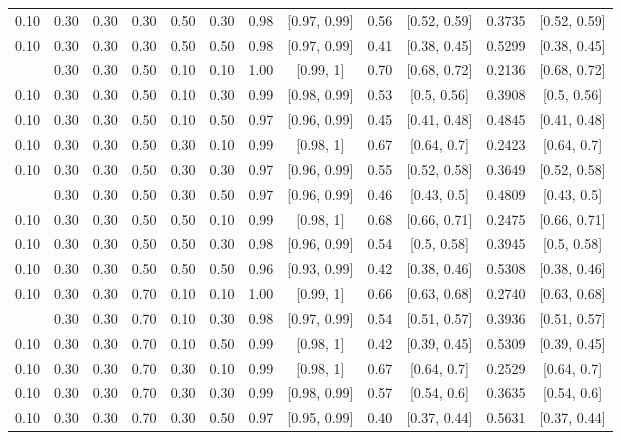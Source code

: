 \documentclass[
  11pt,
]{article}
\begin{document}
\begin{landscape}
\begin{ThreePartTable}
\begin{longtable}[t]{cccccccccccc}
0.10 & 0.30 & 0.30 & 0.30 & 0.50 & 0.30 & 0.98 & {}[0.97, 0.99] & 0.56 & {}[0.52, 0.59] & 0.3735 & {}[0.52, 0.59]\\
0.10 & 0.30 & 0.30 & 0.30 & 0.50 & 0.50 & 0.98 & {}[0.97, 0.99] & 0.41 & {}[0.38, 0.45] & 0.5299 & {}[0.38, 0.45]\\
\addlinespace
0.10 & 0.30 & 0.30 & 0.50 & 0.10 & 0.10 & 1.00 & {}[0.99, 1] & 0.70 & {}[0.68, 0.72] & 0.2136 & {}[0.68, 0.72]\\
0.10 & 0.30 & 0.30 & 0.50 & 0.10 & 0.30 & 0.99 & {}[0.98, 0.99] & 0.53 & {}[0.5, 0.56] & 0.3908 & {}[0.5, 0.56]\\
0.10 & 0.30 & 0.30 & 0.50 & 0.10 & 0.50 & 0.97 & {}[0.96, 0.99] & 0.45 & {}[0.41, 0.48] & 0.4845 & {}[0.41, 0.48]\\
0.10 & 0.30 & 0.30 & 0.50 & 0.30 & 0.10 & 0.99 & {}[0.98, 1] & 0.67 & {}[0.64, 0.7] & 0.2423 & {}[0.64, 0.7]\\
0.10 & 0.30 & 0.30 & 0.50 & 0.30 & 0.30 & 0.97 & {}[0.96, 0.99] & 0.55 & {}[0.52, 0.58] & 0.3649 & {}[0.52, 0.58]\\
\addlinespace
0.10 & 0.30 & 0.30 & 0.50 & 0.30 & 0.50 & 0.97 & {}[0.96, 0.99] & 0.46 & {}[0.43, 0.5] & 0.4809 & {}[0.43, 0.5]\\
0.10 & 0.30 & 0.30 & 0.50 & 0.50 & 0.10 & 0.99 & {}[0.98, 1] & 0.68 & {}[0.66, 0.71] & 0.2475 & {}[0.66, 0.71]\\
0.10 & 0.30 & 0.30 & 0.50 & 0.50 & 0.30 & 0.98 & {}[0.96, 0.99] & 0.54 & {}[0.5, 0.58] & 0.3945 & {}[0.5, 0.58]\\
0.10 & 0.30 & 0.30 & 0.50 & 0.50 & 0.50 & 0.96 & {}[0.93, 0.99] & 0.42 & {}[0.38, 0.46] & 0.5308 & {}[0.38, 0.46]\\
0.10 & 0.30 & 0.30 & 0.70 & 0.10 & 0.10 & 1.00 & {}[0.99, 1] & 0.66 & {}[0.63, 0.68] & 0.2740 & {}[0.63, 0.68]\\
\addlinespace
0.10 & 0.30 & 0.30 & 0.70 & 0.10 & 0.30 & 0.98 & {}[0.97, 0.99] & 0.54 & {}[0.51, 0.57] & 0.3936 & {}[0.51, 0.57]\\
0.10 & 0.30 & 0.30 & 0.70 & 0.10 & 0.50 & 0.99 & {}[0.98, 1] & 0.42 & {}[0.39, 0.45] & 0.5309 & {}[0.39, 0.45]\\
0.10 & 0.30 & 0.30 & 0.70 & 0.30 & 0.10 & 0.99 & {}[0.98, 1] & 0.67 & {}[0.64, 0.7] & 0.2529 & {}[0.64, 0.7]\\
0.10 & 0.30 & 0.30 & 0.70 & 0.30 & 0.30 & 0.99 & {}[0.98, 0.99] & 0.57 & {}[0.54, 0.6] & 0.3635 & {}[0.54, 0.6]\\
0.10 & 0.30 & 0.30 & 0.70 & 0.30 & 0.50 & 0.97 & {}[0.95, 0.99] & 0.40 & {}[0.37, 0.44] & 0.5631 & {}[0.37, 0.44]\\

\end{longtable}
\end{ThreePartTable}
\end{landscape}
\end{document}
